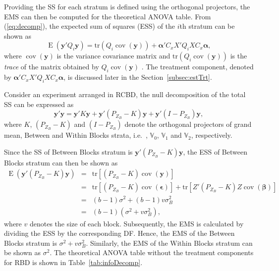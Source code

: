 \documentclass[article]{jss}
\begin{document}
Providing the SS for each stratum is defined using the orthogonal projectors, the EMS can then be computed for the theoretical ANOVA table. From (\ref{eq:decomp}), the expected sum of squares (ESS) of the $i$th stratum can be shown as
\begin{equation}
\label{eq:ESSQuad}
\operatorname{E}(\bm{y}'Q_i\bm{y})= \mathrm{tr}(Q_i\operatorname{cov}(\bm{y})) + \bm{\alpha} ' C_x X'Q_iX C_x\bm{\alpha},
\end{equation}
where $\operatorname{cov}(\bm{y})$ is the variance covariance matrix and $\mathrm{tr}(Q_i\operatorname{cov}(\bm{y}))$ is the \emph{trace} of the matrix obtained by $Q_i\operatorname{cov}(\bm{y})$ \citep{Searle1982}. The treatment component, denoted by $\bm{\alpha} '  C_x X'Q_iX C_x \bm{\alpha}$, is discussed later in the Section~\ref{subsec:estTrt}.

Consider an experiment arranged in RCBD, the null decomposition of the total SS can be expressed as 
\begin{equation}
\label{eq:infoDecomp1}
\bm{y}'\bm{y} = \bm{y}'K\bm{y} + \bm{y}'(P_{Z_B}-K)\bm{y} + \bm{y}'(I - P_{Z_B})\bm{y},
\end{equation}
where $K$, $(P_{Z_B}-K)$ and $(I - P_{Z_B})$ denote the orthogonal projectors of grand mean, Between and Within Blocks strata, i.e.\ , $\mathbb{V}_0$, $\mathbb{V}_1$ and $\mathbb{V}_2$, respectively. 

Since the SS of Between Blocks stratum is $\bm{y}'(P_{Z_B}-K)\bm{y}$, the ESS of Between Blocks stratum can then be shown as 
\begin{eqnarray}
\nonumber \operatorname{E}(\bm{y}'(P_{Z_B}-K)\bm{y}) &=& \mathrm{tr}[(P_{Z_B}-K)\operatorname{cov}(\bm{y})]\\
\nonumber &=& \mathrm{tr}[(P_{Z_B}-K)\operatorname{cov}(\bm{\epsilon})] + \mathrm{tr}[Z'(P_{Z_B}-K)Z\operatorname{cov}(\bm{\beta})]\\ 
\nonumber &=& (b - 1)\sigma^2 + (b - 1)v\sigma^2_B\\
\label{eq:computRBD} &=& (b - 1)(\sigma^2 + v\sigma^2_B),
\end{eqnarray}
where $v$ denotes the size of each block. Subsequently, the EMS is calculated by dividing the ESS by the corresponding DF. Hence, the EMS of the Between Blocks stratum is $\sigma^2 +v\sigma^2_B$. Similarly, the EMS of the Within Blocks stratum can be shown as $\sigma^2$. The theoretical ANOVA table without the treatment components for RBD is shown in Table~\ref{tab:infoDecomp}.
\end{document}
